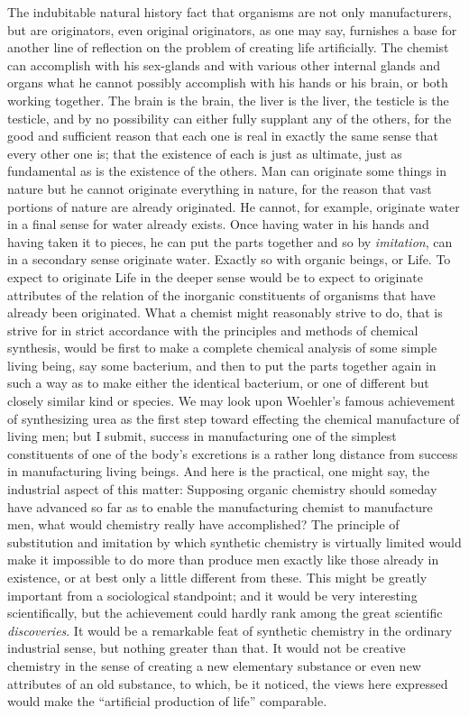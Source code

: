 \documentclass[a4paper, 11pt, oneside, polutonikogreek, english]{article}
\begin{document}
The indubitable natural history fact that organisms are not only manufacturers, but are originators, even original originators, as one may say, furnishes a base for another line of reflection on the problem of creating life artificially. The chemist can accomplish with his sex-glands and with various other internal glands and organs what he cannot possibly accomplish with his hands or his brain, or both working together. The brain is the brain, the liver is the liver, the testicle is the testicle, and by no possibility can either fully supplant any of the others, for the good and sufficient reason that each one is real in exactly the same sense that every other one is; that the existence of each is just as ultimate, just as fundamental as is the existence of the others. Man can originate some things in nature but he cannot originate everything in nature, for the reason that vast portions of nature are already originated. He cannot, for example, originate water in a final sense for water already exists. Once having water in his hands and having taken it to pieces, he can put the parts together and so by \emph{imitation}, can in a secondary sense originate water. Exactly so with organic beings, or Life. To expect to originate Life in the deeper sense would be to expect to originate attributes of the relation of the inorganic constituents of organisms that have already been originated. What a chemist might reasonably strive to do, that is strive for in strict accordance with the principles and methods of chemical synthesis, would be first to make a complete chemical analysis of some simple living being, say some bacterium, and then to put the parts together again in such a way as to make either the identical bacterium, or one of different but closely similar kind or species. We may look upon Woehler's famous achievement of synthesizing urea as the first step toward effecting the chemical manufacture of living men; but I submit, success in manufacturing one of the simplest constituents of one of the body's excretions is a rather long distance from success in manufacturing living beings. And here is the practical, one might say, the industrial aspect of this matter: Supposing organic chemistry should someday have advanced so far as to enable the manufacturing chemist to manufacture men, what would chemistry really have accomplished? The principle of substitution and imitation by which synthetic chemistry is virtually limited would make it impossible to do more than produce men exactly like those already in existence, or at best only a little different from these. This might be greatly important from a sociological standpoint; and it would be very interesting scientifically, but the achievement could hardly rank among the great scientific \emph{discoveries}. It would be a remarkable feat of synthetic chemistry in the ordinary industrial sense, but nothing greater than that. It would not be creative chemistry in the sense of creating a new elementary substance or even new attributes of an old substance, to which, be it noticed, the views here expressed would make the ``artificial production of life'' comparable.
\end{document}
